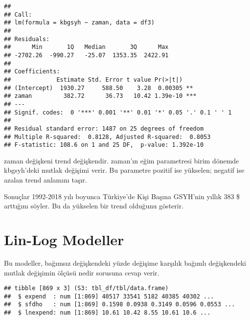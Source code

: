 \documentclass[
]{book}
\newenvironment{Shaded}{\begin{snugshade}}{\end{snugshade}}
\newcommand{\CommentTok}[1]{\textcolor[rgb]{0.56,0.35,0.01}{\textit{#1}}}
\newcommand{\DataTypeTok}[1]{\textcolor[rgb]{0.13,0.29,0.53}{#1}}
\newcommand{\KeywordTok}[1]{\textcolor[rgb]{0.13,0.29,0.53}{\textbf{#1}}}
\newcommand{\NormalTok}[1]{#1}
\newcommand{\OperatorTok}[1]{\textcolor[rgb]{0.81,0.36,0.00}{\textbf{#1}}}
\newcommand{\StringTok}[1]{\textcolor[rgb]{0.31,0.60,0.02}{#1}}
\begin{document}
\begin{verbatim}
## 
## Call:
## lm(formula = kbgsyh ~ zaman, data = df3)
## 
## Residuals:
##      Min       1Q   Median       3Q      Max 
## -2702.26  -990.27   -25.07  1353.35  2422.91 
## 
## Coefficients:
##             Estimate Std. Error t value Pr(>|t|)    
## (Intercept)  1930.27     588.50    3.28  0.00305 ** 
## zaman         382.72      36.73   10.42 1.39e-10 ***
## ---
## Signif. codes:  0 '***' 0.001 '**' 0.01 '*' 0.05 '.' 0.1 ' ' 1
## 
## Residual standard error: 1487 on 25 degrees of freedom
## Multiple R-squared:  0.8128, Adjusted R-squared:  0.8053 
## F-statistic: 108.6 on 1 and 25 DF,  p-value: 1.392e-10
\end{verbatim}

zaman değişkeni trend değişkendir. zaman'ın eğim parametresi birim dönemde kbgsyh'deki mutlak değişimi verir. Bu parametre pozitif ise yükselen; negatif ise azalan trend anlamını taşır.

Sonuçlar 1992-2018 yılı boyunca Türkiye'de Kişi Başına GSYH'nin yıllık 383 \$ arttığını söyler. Bu da yükselen bir trend olduğunu gösterir.

\hypertarget{lin-log-modeller}{%
\section{Lin-Log Modeller}\label{lin-log-modeller}}

Bu modeller, bağımsız değişkendeki yüzde değişime karşılık bağımlı değişkendeki mutlak değişimin ölçüsü nedir sorusuna cevap verir.

\begin{Shaded}
\end{Shaded}

\begin{verbatim}
## tibble [869 x 3] (S3: tbl_df/tbl/data.frame)
##  $ expend  : num [1:869] 40517 33541 5182 40385 40302 ...
##  $ sfdho   : num [1:869] 0.1598 0.0938 0.3149 0.0596 0.0553 ...
##  $ lnexpend: num [1:869] 10.61 10.42 8.55 10.61 10.6 ...
\end{verbatim}
\end{document}
